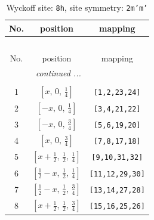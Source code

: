 \documentclass[fleqn,8pt]{jsarticle}
\begin{document}
\begin{longtable}{ccc}
\caption{Wyckoff site: {\tt 8h}, site symmetry: {\tt 2m'm'}}
 \\
 \hline \hline
No. & position & mapping \\ \hline \endfirsthead

\multicolumn{2}{l}{\tablename\ \thetable{}} \\
 \hline \hline
No. & position & mapping \\ \hline \endhead

 \hline \hline
\multicolumn{2}{r}{\footnotesize\it continued ...} \\ \endfoot

 \hline \hline
\multicolumn{2}{r}{} \\ \endlastfoot

1 & $\left[ x,\, 0,\, \frac{1}{4} \right]$ & {\tt [1,2,23,24]} \\ \hline
2 & $\left[ - x,\, 0,\, \frac{1}{4} \right]$ & {\tt [3,4,21,22]} \\ \hline
3 & $\left[ - x,\, 0,\, \frac{3}{4} \right]$ & {\tt [5,6,19,20]} \\ \hline
4 & $\left[ x,\, 0,\, \frac{3}{4} \right]$ & {\tt [7,8,17,18]} \\ \hline
5 & $\left[ x + \frac{1}{2},\, \frac{1}{2},\, \frac{1}{4} \right]$ & {\tt [9,10,31,32]} \\ \hline
6 & $\left[ \frac{1}{2} - x,\, \frac{1}{2},\, \frac{1}{4} \right]$ & {\tt [11,12,29,30]} \\ \hline
7 & $\left[ \frac{1}{2} - x,\, \frac{1}{2},\, \frac{3}{4} \right]$ & {\tt [13,14,27,28]} \\ \hline
8 & $\left[ x + \frac{1}{2},\, \frac{1}{2},\, \frac{3}{4} \right]$ & {\tt [15,16,25,26]} \\
\end{longtable}
\renewcommand{\arraystretch}{1.2}
\end{document}
